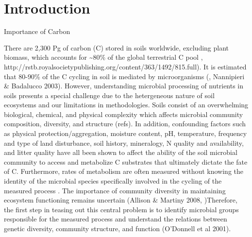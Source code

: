 \section{Introduction} 
Importance of Carbon 

There are 2,300 Pg of carbon (C) stored in soils worldwide, excluding plant biomass, which accounts for \sim80\% of the global terrestrial C pool \cite{Amundson_2001,IPCC 2000,IPCC 2007,elsen_Ayres_Wall_Bardgett_2011,Lal_2008,BATJES_1996}, http://rstb.royalsocietypublishing.org/content/363/1492/815.full). It is estimated that 80-90\% of the C cycling in soil is mediated by microorganisms (\cite{Coleman_&_Crossley_1996}, Nannipieri & Badalucco 2003). However, understanding microbial processing of nutrients in soils presents a special challenge due to the hetergeneous nature of soil ecosystems and our limitations in methodologies. Soils consist of an overwhelming biological, chemical, and physical complexity which affects microbial community composition, diversity, and structure (refs).  In addition, confounding factors such as physical protection/aggregation, moisture content, pH, temperature, frequency and type of land disturbance, soil history, mineralogy, N quality and availability, and litter quality have all been shown to affect the ability of the soil microbial community to access and metabolize C substrates \cite{Schlesinger_1977,dgett_Wall_Hattenschwiler_2010,Sollins_Homann_Caldwell_1996,Torn_Vitousek_Trumbore_2005,TRUMBORE_2006} that ultimately dictate the fate of C. Furthermore, rates of metabolism are often measured without knowing the identity of the microbial species specifically involved in the cycling of the measured process \cite{ndi_Pietramellara_Renella_2003}.  The importance of community diversity in maintaining ecosystem functioning remains uncertain (Allison & Martiny 2008, \cite{ndi_Pietramellara_Renella_2003})Therefore, the first step in teasing out this central problem is to identify microbial groups responsible for the measured process and understand the relations between genetic diversity, community structure, and function (O’Donnell et al 2001).  


